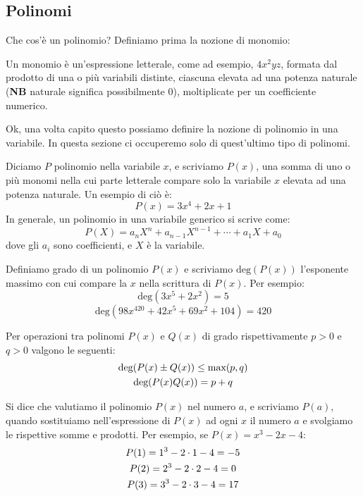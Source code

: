\documentclass[11pt]{scrartcl}
\begin{document}
	\subsection{Polinomi}
	Che cos'è un polinomio? Definiamo prima la nozione di monomio:
	\begin{definition}
		Un monomio è un'espressione letterale, come ad esempio, $4x^2yz$, formata dal prodotto di una o più variabili distinte, ciascuna elevata ad una potenza naturale (\textbf{NB} naturale significa possibilmente $0$), moltiplicate per un coefficiente numerico.
	\end{definition}
	Ok, una volta capito questo possiamo definire la nozione di polinomio in una variabile. In questa sezione ci occuperemo solo di quest'ultimo tipo di polinomi.
	\begin{definition}
		\label{polinomio}
		Diciamo $P$ polinomio nella variabile $x$, e scriviamo $P(x)$, una somma di uno o più monomi nella cui parte letterale compare solo la variabile $x$ elevata ad una potenza naturale. Un esempio di ciò è:
		$$P(x)=3x^4+2x+1$$
		In generale, un polinomio in una variabile generico si scrive come:
		$$P(X)=a_nX^n  + a_{n-1}X^{n-1} +\cdots + a_1 X+ a_0$$
		dove gli $a_i$ sono coefficienti, e $X$ è la variabile.
		
	\end{definition}
	\begin{definition}
		Definiamo grado di un polinomio $P(x)$ e scriviamo $\text{deg}(P(x))$ l'esponente massimo con cui compare la $x$ nella scrittura di $P(x)$. Per esempio:
		$$\text{deg}(3x^5+2x^2)=5$$
		$$\text{deg}(98x^{420}+42x^5+69x^2+104)=420$$
	\end{definition}
	\begin{theorem}
		Per operazioni tra polinomi $P(x)$ e $Q(x)$ di grado rispettivamente $p>0$ e $q>0$ valgono le seguenti:
		\begin{gather}
			\notag \text{deg}(P(x) \pm Q(x)) \le \text{max}(p,q) \\
			\notag \text{deg}(P(x)Q(x)) = p + q
		\end{gather}
	\end{theorem}
	\begin{definition}
		Si dice che valutiamo il polinomio $P(x)$ nel numero $a$, e scriviamo $P(a)$, quando sostituiamo nell'espressione di $P(x)$ ad ogni $x$ il numero $a$ e svolgiamo le rispettive somme e prodotti. Per esempio, se $P(x)=x^3-2x-4$:
		\begin{gather} \notag
			P(1)=1^3-2\cdot1-4=-5 \\ \notag
			P(2)=2^3-2\cdot2-4=0 \\ \notag
			P(3)=3^3-2\cdot3-4=17  \notag
		\end{gather}
	\end{definition}
\end{document}
